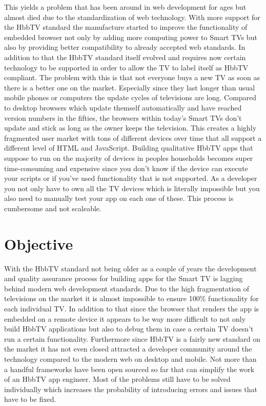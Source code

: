 This yields a problem that has been around in web development for ages but almost died due to the standardization
of web technology. With more support for the HbbTV standard the manufacture started to improve the functionality
of embedded browser not only by adding more computing power to Smart TVs but also by providing better compatibility
to already accepted web standards. In addition to that the HbbTV standard itself evolved and requires now certain
technology to be supported in order to allow the TV to label itself as HbbTV compliant. The problem with this is
that not everyone buys a new TV as soon as there is a better one on the market. Especially since they last longer
than usual mobile phones or computers the update cycles of televisions are long. Compared to desktop browsers which
update themself automatically and have reached version numbers in the fifties, the browsers within today's Smart
TVs don't update and stick as long as the owner keeps the television. This creates a highly fragmented
user market with tons of different devices over time that all support a different level of HTML and JavaScript.
Building qualitative HbbTV apps that suppose to run on the majority of devices in peoples households becomes super
time-consuming and expensive since you don't know if the device can execute your scripts or if you've used
functionality that is not supported. As a developer you not only have to own all the TV devices which is literally
impossible but you also need to manually test your app on each one of these. This process is cumbersome and not
scaleable.

\section{Objective\label{sec:objective}}

With the HbbTV standard not being older as a couple of years the development and quality assurance process for
building apps for the Smart TV is lagging behind modern web development standards. Due to the high fragmentation
of televisions on the market it is almost impossible to ensure 100\% functionality for each individual TV.
In addition to that since the browser that renders the app is embedded on a remote device it appears to be
way more difficult to not only build HbbTV applications but also to debug them in case a certain TV doesn't
run a certain functionality. Furthermore since HbbTV is a fairly new standard on the market it has not
even closed attracted a developer community around the technology compared to the modern web on desktop and
mobile. Not more than a handful frameworks have been open sourced so far that can simplify the work of an HbbTV
app engineer. Most of the problems still have to be solved individually which increases the probability of
introducing errors and issues that have to be fixed.

